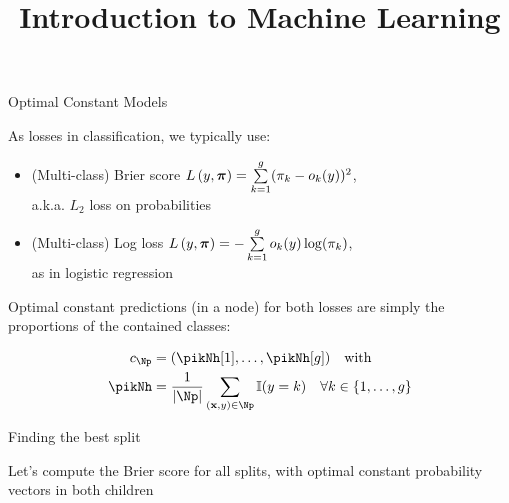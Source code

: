 \documentclass[11pt,compress,t,notes=noshow, xcolor=table]{beamer}
\title{Introduction to Machine Learning}
\begin{document}

\begin{vbframe}{Optimal Constant Models}

As losses in classification, we typically use: 

\begin{itemize}
\item (Multi-class) Brier score $L\left(y, \bm{\pi}\right) =  \sum\limits_{k=1}^g (\pi_{k} - o_k(y))^2$,\\ a.k.a. $L_2$ loss on probabilities
\item (Multi-class) Log loss $L\left(y, \bm{\pi}\right) =  - \sum\limits_{k=1}^g o_k(y) \log(\pi_{k})$, \\
as in logistic regression
\end{itemize}


Optimal constant predictions (in a node) for both losses are simply the proportions of the contained classes:

\begin{align*}
c_{\Np} &= (\pikNh[1], \dots, \pikNh[g]) \quad \text{with}\\
\pikNh &= \frac{1}{|\Np|} \sum\limits_{(\xv,y) \in \Np} \I(y = k) \quad \forall k \in \gset
\end{align*}


\end{vbframe}


\begin{frame}[b]{Finding the best split}

Let's compute the Brier score for all splits, with optimal constant probability vectors in both children

\vspace{0.5cm}

\end{frame}
\end{document}

